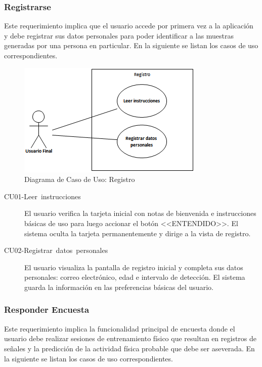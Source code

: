 \subsubsection{Registrarse}

Este requerimiento implica que el usuario accede por primera vez a
la aplicación y debe registrar sus datos personales para poder identificar
a las muestras generadas por una persona en particular. En la siguiente
 se listan los casos de uso correspondientes.

\begin{figure}[H]
\begin{centering}
\includegraphics{capitulo-5/graphics/caso_registro}
\par\end{centering}
\caption[Diagrama de Caso de Uso: Registro]{\label{fig5:uc-registro}Diagrama de Caso de Uso: Registro}
\end{figure}

\begin{description}
\item [{CU01-Leer~instrucciones}] El usuario verifica la tarjeta inicial
con notas de bienvenida e instrucciones básicas de uso para luego
accionar el botón <<ENTENDIDO>>. El sistema oculta la tarjeta permanentemente
y dirige a la vista de registro.
\item [{CU02-Registrar~datos~personales}] El usuario visualiza la pantalla
de registro inicial y completa sus datos personales: correo electrónico,
edad e intervalo de detección. El sistema guarda la información en
las preferencias básicas del usuario.
\end{description}

\subsubsection{Responder Encuesta}

Este requerimiento implica la funcionalidad principal de encuesta
donde el usuario debe realizar sesiones de entrenamiento físico que
resultan en registros de señales y la predicción de la actividad física
probable que debe ser aseverada. En la siguiente 
se listan los casos de uso correspondientes.

